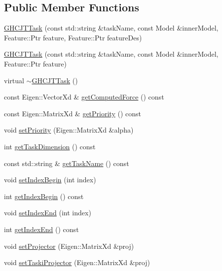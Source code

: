 \subsection*{Public Member Functions}
\begin{DoxyCompactItemize}
\item 
\hyperlink{classgocra_1_1GHCJTTask_a9161a72cfe5261e5a3580fba578ef23f}{G\+H\+C\+J\+T\+Task} (const std\+::string \&task\+Name, const Model \&inner\+Model, Feature\+::\+Ptr feature, Feature\+::\+Ptr feature\+Des)
\item 
\hyperlink{classgocra_1_1GHCJTTask_a45a0f844d1e8e3a2d500da01a6606a03}{G\+H\+C\+J\+T\+Task} (const std\+::string \&task\+Name, const Model \&inner\+Model, Feature\+::\+Ptr feature)
\item 
virtual \hyperlink{classgocra_1_1GHCJTTask_a258ac19e0b4a3aab26b4aebfeb2c26d8}{$\sim$\+G\+H\+C\+J\+T\+Task} ()
\item 
const Eigen\+::\+Vector\+Xd \& \hyperlink{classgocra_1_1GHCJTTask_a088d67ee49cbdc57ad2b77e2d89afae0}{get\+Computed\+Force} () const
\item 
const Eigen\+::\+Matrix\+Xd \& \hyperlink{classgocra_1_1GHCJTTask_a3f9898bd47735158641a52ac36be2801}{get\+Priority} () const
\item 
void \hyperlink{classgocra_1_1GHCJTTask_a5dce074858a320d3277eb5e0c8fc1d0c}{set\+Priority} (Eigen\+::\+Matrix\+Xd \&alpha)
\item 
int \hyperlink{classgocra_1_1GHCJTTask_a7c7f6781003d4ecad41e65fd417ddf48}{get\+Task\+Dimension} () const
\item 
const std\+::string \& \hyperlink{classgocra_1_1GHCJTTask_ac382ad3227454bc831ce5930c7a7519a}{get\+Task\+Name} () const
\item 
void \hyperlink{classgocra_1_1GHCJTTask_adb7d719214756cc13927b3587b4e6219}{set\+Index\+Begin} (int index)
\item 
int \hyperlink{classgocra_1_1GHCJTTask_ab7732146f0db17c8a7b0f1c2d7c163a1}{get\+Index\+Begin} () const
\item 
void \hyperlink{classgocra_1_1GHCJTTask_a26739b301ace2b23b7217f5aa18afd5e}{set\+Index\+End} (int index)
\item 
int \hyperlink{classgocra_1_1GHCJTTask_a4a6c3086e34d30638dae944de48dcde1}{get\+Index\+End} () const
\item 
void \hyperlink{classgocra_1_1GHCJTTask_a391580beeeb10e00c4cd88e9fe241a2c}{set\+Projector} (Eigen\+::\+Matrix\+Xd \&proj)
\item 
void \hyperlink{classgocra_1_1GHCJTTask_a8a6eff40a7476c8715a4cfbac756655e}{set\+Taski\+Projector} (Eigen\+::\+Matrix\+Xd \&proj)

\end{DoxyCompactItemize}
